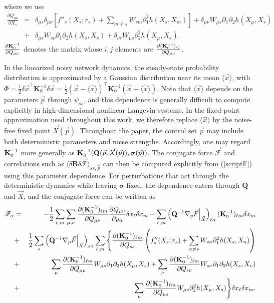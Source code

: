 where we use
\begin{eqnarray}
    \frac{\partial Q_{\mu\nu}}{\partial X_s} &=& \delta_{\mu s} \delta_{\mu\nu} \left[ f''_s(X_s;r_s)+\sum_{m\neq s} W_{sm} \partial_1^2 h(X_s,X_m) \right] + \delta_{\mu\nu} W_{\mu s} \partial_1\partial_2 h(X_\mu,X_s)\nonumber\\
    &+&\delta_{\mu s} W_{s\nu} \partial_1 \partial_2 h (X_s,X_\nu)+\delta_{\nu s} W_{\mu s} \partial_2^2 h (X_\mu,X_s).
\end{eqnarray}
$ \frac{\partial {\bf K}_0^{-1}}{\partial Q_{\mu\nu}}  $ denotes the matrix whose $i,j$ elements are $\frac{\partial ({\bf K}_0^{-1})_{ij}}{\partial Q_{\mu\nu}}$.\par
In the linearized noisy network dynamics, the steady-state probability distribution is approximated by a Gaussian distribution near its mean $\langle \vec{x} \rangle$, with $\Phi = \frac{1}{2} \delta \vec{x}^\intercal \mathbf{K}^{-1}_0 \delta \vec{x} = \frac{1}{2} (\vec{x}-\langle \vec{x} \rangle)^\intercal \mathbf{K}^{-1}_0 (\vec{x}-\langle \vec{x} \rangle)$. Note that $\langle {\vec x} \rangle$ depends on the parameters ${\vec p}$ through $\psi_{ss}$, and this dependence is generally difficult to compute explicitly in high-dimensional nonlinear Langevin systems. In the fixed-point approximation used throughout this work, we therefore replace $\langle \vec{x} \rangle$ by the noise-free fixed point $\vec{X}(\vec p)$. Throughout the paper, the control set $\vec p$ may include both deterministic parameters and noise strengths. Accordingly, one may regard ${\bf K}_0^{-1}$ more generally as ${\bf K}_0^{-1}({\bf Q}({\vec p},{\vec X}({\vec p})),\boldsymbol{\sigma}(\vec p))$. The conjugate force ${\vec{\mathscr F}}$ and correlations such as $\langle\delta \mathbf{B} \delta\vec{\mathscr F}\rangle_{ss,{\vec p}}$ can then be computed explicitly from (\ref{scriptF}) using this parameter dependence. For perturbations that act through the deterministic dynamics while leaving $\boldsymbol{\sigma}$ fixed, the dependence enters through $\mathbf{Q}$ and $\vec X$, and the conjugate force can be written as
\begin{eqnarray}
{\mathscr F}_\alpha&=& - \frac{1}{2} \sum_{\ell, m}\sum_{\mu,\nu} \frac{\partial ({\bf K}_0^{-1})_{\ell m}} {\partial Q_{\mu\nu}}\frac {\partial Q_{\mu\nu}}{\partial p_\alpha} \delta x_\ell \delta x_m -\sum_{\ell, m} \left({\bf Q}^{-1} \nabla_p{\vec { F}} \Big|_{\vec X}\right)_{\ell\alpha}({\bf K}_0^{-1})_{\ell m}\delta x_m \label{Falp}\\
&+&\frac{1}{2} \sum_s \left({\bf Q}^{-1} \nabla_p{\vec { F}} \Big|_{\vec X}\right)_{s\alpha} \sum_{\ell,m} \Bigg\{ \frac{\partial (\mathbf{K}_0^{-1})_{\ell m}}{\partial Q_{ss}}\left( f_s''(X_s;r_s)+\sum_{n\neq s} W_{sn} \partial^2_1 h(X_s, X_n) \right)\nonumber\\
&+& \sum_\mu \frac{\partial (\mathbf{K}_0^{-1})_{\ell m}}{\partial Q_{\mu\mu}} W_{\mu s} \partial_1 \partial_2 h(X_\mu, X_s) + \sum_\nu \frac{\partial (\mathbf{K}_0^{-1})_{\ell m}}{\partial Q_{s\nu}} W_{s\nu}\partial_1\partial_2 h(X_s,X_\nu)\nonumber\\ &+& \sum_\mu \frac{\partial (\mathbf{K}_0^{-1})_{\ell m}}{\partial Q_{\mu s}} W_{\mu s} \partial^2_2 h(X_\mu, X_s) \Bigg\} \delta x_\ell \delta x_m .\nonumber
\end{eqnarray}
